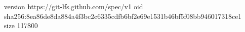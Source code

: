 version https://git-lfs.github.com/spec/v1
oid sha256:8ea86de8da884a4f3bc2c6335cdfb6bf2e69e1531b46bf5f08bb946017318ce1
size 117800

